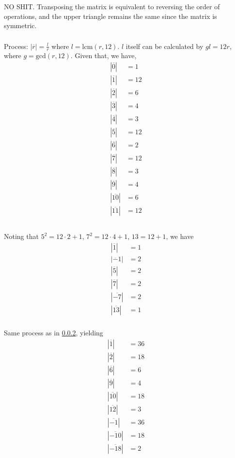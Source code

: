 \documentclass{article}
\newcommand{\abs}[1]{| #1 |}
\renewcommand{\bar}{\overline}
\begin{document}
\subsubsection{}
NO SHIT. Transposing the matrix is equivalent to reversing the order of operations, and the upper triangle remains the same since the matrix is symmetric.
\subsubsection{}\label{ex11}
Process: $|\bar r| = \frac{l}{r}$ where $l = \mbox{lcm}(r,12)$. $l$ itself can be calculated by $gl = 12r$, where $g=\mbox{gcd}(r,12)$. Given that, we have,
\begin{align*}
\abs{\bar 0 } &= 1\\
\abs{\bar 1 } &= 12\\
\abs{\bar 2 } &= 6\\
\abs{\bar 3 } &= 4\\
\abs{\bar 4 } &= 3\\
\abs{\bar 5 } &= 12\\
\abs{\bar 6 } &= 2\\
\abs{\bar 7 } &= 12\\
\abs{\bar 8 } &= 3\\
\abs{\bar 9 } &= 4\\
\abs{\bar{10} } &= 6\\
\abs{\bar{11} } &= 12\\
\end{align*}
\subsubsection{}
Noting that $5^2 = 12\cdot 2 + 1$, $7^2 = 12\cdot 4+1$, $13 = 12+1$, we have
\begin{align*}
\abs{\bar 1 } &= 1\\
\abs{\bar -1 } &= 2\\
\abs{\bar 5 } &= 2\\
\abs{\bar 7 } &= 2\\
\abs{\bar{-7} } &= 2\\
\abs{\bar{13}} &= 1
\end{align*}
\subsubsection{}
Same process as in \ref{ex11}, yielding
\begin{align*}
\abs{\bar 1 } &= 36\\
\abs{\bar 2 } &= 18\\
\abs{\bar 6 } &= 6\\
\abs{\bar 9 } &= 4\\
\abs{\bar{10}} &= 18\\
\abs{\bar{12} } &= 3\\
\abs{\bar{ -1} } &= 36\\
\abs{\bar{ -10 }} &= 18\\
\abs{\bar{-18 }} &= 2\\
\end{align*}
\end{document}
